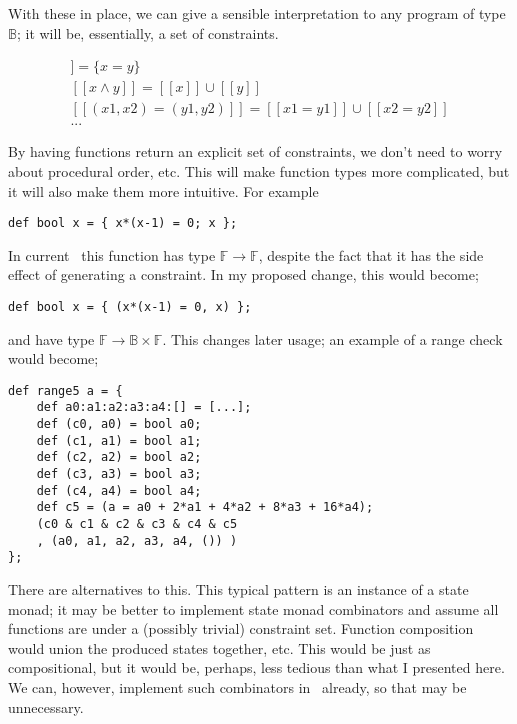 \documentclass[
    9pt,            %
    techreport,        %
    affiltop,       %
]{art}
\begin{document}
With these in place, we can give a sensible interpretation to any program of type $\mathbb{B}$; it will be, essentially, a set of constraints.

\begin{align*}
    [[ x = y ]] = \{x = y\}\\
    [[ x \wedge y ]] = [[x]] \cup [[y]]\\
    [[ (x1, x2) = (y1, y2) ]] = [[x1 = y1]] \cup [[x2 = y2]]\\
    ...
\end{align*}

By having functions return an explicit set of constraints, we don't need to worry about procedural order, etc. This will make function types more complicated, but it will also make them more intuitive. For example

\begin{verbatim}
def bool x = { x*(x-1) = 0; x };
\end{verbatim}

In current \VampIR{}\ this function has type $\mathbb{F} \rightarrow \mathbb{F}$, despite the fact that it has the side effect of generating a constraint. In my proposed change, this would become;

\begin{verbatim}
def bool x = { (x*(x-1) = 0, x) };
\end{verbatim}

and have type $\mathbb{F} \rightarrow \mathbb{B} \times \mathbb{F}$. This changes later usage; an example of a range check would become;

\begin{verbatim}
def range5 a = {
    def a0:a1:a2:a3:a4:[] = [...];
    def (c0, a0) = bool a0;
    def (c1, a1) = bool a1;
    def (c2, a2) = bool a2;
    def (c3, a3) = bool a3;
    def (c4, a4) = bool a4;
    def c5 = (a = a0 + 2*a1 + 4*a2 + 8*a3 + 16*a4);
    (c0 & c1 & c2 & c3 & c4 & c5
    , (a0, a1, a2, a3, a4, ()) )
};
\end{verbatim}

There are alternatives to this. This typical pattern is an instance of a state monad; it may be better to implement state monad combinators and assume all functions are under a (possibly trivial) constraint set. Function composition would union the produced states together, etc. This would be just as compositional, but it would be, perhaps, less tedious than what I presented here. We can, however, implement such combinators in \VampIR{}\ already, so that may be unnecessary.
\end{document}
